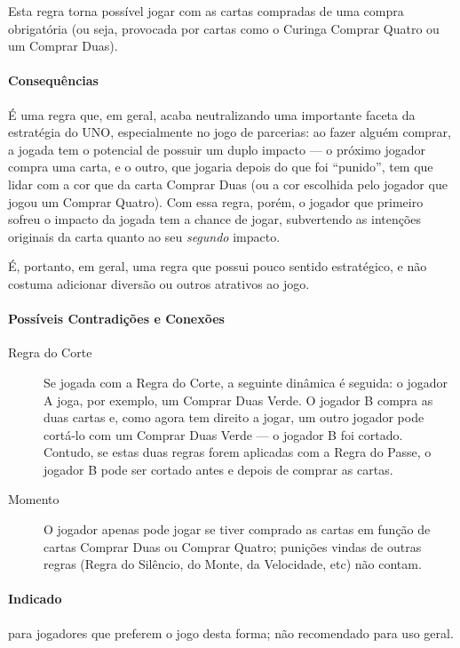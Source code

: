 Esta regra torna possível jogar com as cartas compradas de uma compra obrigatória (ou seja, provocada por cartas como o Curinga Comprar Quatro ou um Comprar Duas).

\paragraph{Consequências}

É uma regra que, em geral, acaba neutralizando uma importante faceta da estratégia do UNO, especialmente no jogo de parcerias: ao fazer alguém comprar, a jogada tem o potencial de possuir um duplo impacto --- o próximo jogador compra uma carta, e o outro, que jogaria depois do que foi ``punido'', tem que lidar com a cor que da carta Comprar Duas (ou a cor escolhida pelo jogador que jogou um Comprar Quatro). Com essa regra, porém, o jogador que primeiro sofreu o impacto da jogada tem a chance de jogar, subvertendo as intenções originais da carta quanto ao seu \emph{segundo} impacto.

É, portanto, em geral, uma regra que possui pouco sentido estratégico, e não costuma adicionar diversão ou outros atrativos ao jogo.

\paragraph{Possíveis Contradições e Conexões}

\begin{description}
\item[Regra do Corte]{Se jogada com a Regra do Corte, a seguinte dinâmica é seguida: o jogador A joga, por exemplo, um Comprar Duas Verde. O jogador B compra as duas cartas e, como agora tem direito a jogar, um outro jogador pode cortá-lo com um Comprar Duas Verde --- o jogador B foi cortado. Contudo, se estas duas regras forem aplicadas com a Regra do Passe, o jogador B pode ser cortado antes e depois de comprar as cartas.}
\item[Momento]{O jogador apenas pode jogar se tiver comprado as cartas em função de cartas Comprar Duas ou Comprar Quatro; punições vindas de outras regras (Regra do Silêncio, do Monte, da Velocidade, etc) não contam.}
\end{description}

\paragraph{Indicado} 

para jogadores que preferem o jogo desta forma; não recomendado para uso geral.

